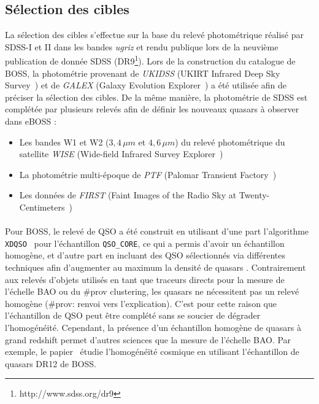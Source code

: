 \documentclass[11pt, twoside, a4paper, openright]{report}
\begin{document}
\subsection{Sélection des cibles}

La sélection des cibles s'effectue sur la base du relevé photométrique réalisé par SDSS-I et II dans les bandes \emph{ugriz} et rendu publique lors de la neuvième publication de donnée SDSS (DR9\footnote{http://www.sdss.org/dr9}).
Lors de la construction du catalogue de BOSS, la photométrie provenant de \emph{UKIDSS} (UKIRT Infrared Deep Sky Survey~\cite{Lawrence2006}) et de \emph{GALEX} (Galaxy Evolution Explorer~\cite{Martin2004}) a été utilisée afin de préciser la sélection des cibles.
De la même manière, la photométrie de SDSS est complétée par plusieurs relevés afin de définir les nouveaux quasars à observer dans eBOSS :
\begin{itemize}
\item Les bandes W1 et W2 ($3,4\,\mu m$ et $4,6\,\mu m$) du relevé photométrique du satellite \emph{WISE} (Wide-field Infrared Survey Explorer~\cite{Wright2010})
\item La photométrie multi-époque de \emph{PTF} (Palomar Transient Factory~\cite{Law2009})
\item Les données de \emph{FIRST} (Faint Images of the Radio Sky at Twenty-Centimeters~\cite{Becker1995})
\end{itemize}


\paragraph{} Pour BOSS, le relevé de QSO a été construit en utilisant d'une part l'algorithme \texttt{XDQSO}~\cite{Bovy2010a} pour l'échantillon \texttt{QSO\_CORE}, ce qui a permis d'avoir un échantillon homogène, et d'autre part en incluant des QSO sélectionnés via différentes techniques afin d'augmenter au maximum la densité de quasars \lya{}.
Contrairement aux relevés d'objets utilisés en tant que traceurs directs pour la mesure de l'échelle BAO ou du \#prov clustering, les quasars \lya{} ne nécessitent pas un relevé homogène (\#prov: renvoi vers l'explication).
C'est pour cette raison que l'échantillon de QSO \lya{} peut être complété sans se soucier de dégrader l'homogénéité.
Cependant, la présence d'un échantillon homogène de quasars à grand redshift permet d'autres sciences que la mesure de l'échelle BAO.
Par exemple, le papier~\cite{Laurent2016} étudie l'homogénéïté cosmique en utilisant l'échantillon de quasars DR12 de BOSS.
\end{document}
